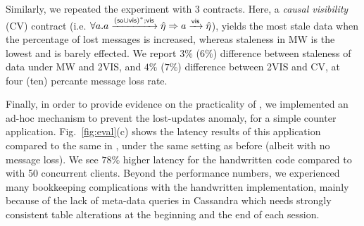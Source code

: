 Similarly, we repeated the experiment with 3 \UB{} contracts. Here, a
\emph{causal visibility} (CV) contract (i.e. {\footnotesize $ \forall a.
a\xrightarrow{({\textsf{so}}\cup{\normalfont \textsf{vis}})^*;{\normalfont \textsf{vis}}}\hat{\eta}\Rightarrow a\xrightarrow{{\normalfont \textsf{vis}}}
\hat{\eta} $}), yields the most stale data when the percentage of lost
messages is increased, whereas staleness in MW is the lowest and is
barely effected. We report $3\%$ ($6\%$) difference 
between staleness of data under MW and 2VIS, and $4\%$ ($7\%$)
difference between 2VIS and CV,
at four (ten) percante message
loss rate.



Finally, in order to provide evidence on the practicality of \tool, we
implemented an ad-hoc mechanism to prevent the lost-updates anomaly,
for a simple counter application. Fig.~\ref{fig:eval}(c) shows the
latency results of this application compared to the same in \tool,
under the same setting as before (albeit with no message loss).  We
see $78\%$ higher latency for the handwritten code compared to \tool
with 50 concurrent clients.  Beyond the performance numbers, we
experienced many bookkeeping complications with the handwritten
implementation, mainly because of the lack of meta-data queries in
Cassandra which needs strongly consistent table alterations at the
beginning and the end of each session.










































